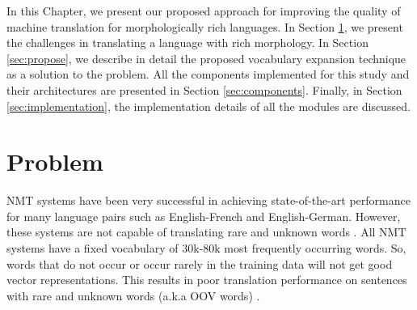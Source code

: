 





In this Chapter, we present our proposed approach for improving the quality of machine translation for morphologically rich languages. In Section \ref{sec:problem}, we present the challenges in translating a language with rich morphology. In Section \ref{sec:propose}, we describe in detail the proposed vocabulary expansion technique as a solution to the problem. All the components implemented for this study and their architectures are presented in Section \ref{sec:components}. Finally, in Section \ref{sec:implementation}, the implementation details of all the modules are discussed.


\section{Problem}
\label{sec:problem}
NMT systems have been very successful in achieving state-of-the-art performance for many language pairs such as English-French and English-German. However, these systems are not capable of translating rare and unknown words \citep{luong2015addressing}. All NMT systems have a fixed vocabulary of 30k-80k most frequently occurring words. So, words that do not occur or occur rarely in the training data will not get good vector representations. This results in poor translation performance on sentences with rare and unknown words (a.k.a OOV words) \citep{sutskever2014sequence,bahdanau2014neural}. 


